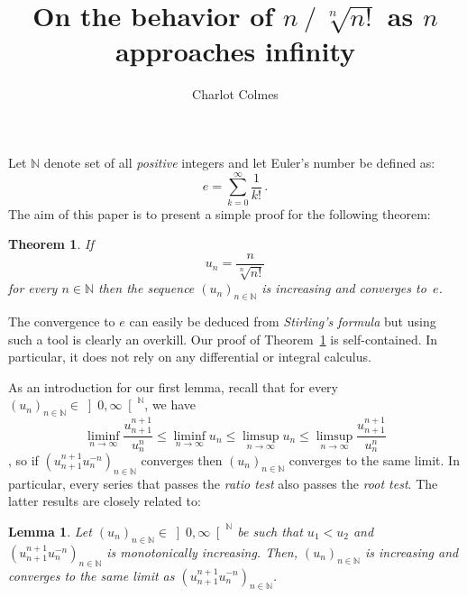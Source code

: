\documentclass[12pt]{article}
\newcommand{\bN}{\mathbb{N}} %
\newcommand{\Rpos}{\left]0, \infty\right[} %
\newtheorem{theorem}{Theorem}
\newtheorem{lemma}{Lemma}
\begin{document}
\sloppy

\title{On the behavior of $n \mathbin{/} \sqrt[n]{n!}$ as $n$ approaches infinity} 
\author{Charlot Colmes}
\maketitle

Let $\bN$ denote set of all \emph{positive} integers and
let Euler's number be defined as:
$$
e = \sum_{k = 0}^\infty \frac{1}{k!} \,. 
$$
The aim of this paper is to present a simple proof for the following theorem:

\begin{theorem} \label{thm:factnn-e}
If
$$
u_n = \frac{n}{\sqrt[n]{n!}}
$$
for every $n \in \bN$ then
the sequence $\left( u_n  \right)_{n \in \bN}$ is increasing and converges to~$e$.
\end{theorem}

The convergence to $e$ can easily be deduced from \emph{Stirling's formula}
\cite{GiaquintaModicaApprox, RudinPrinciples}
but using such a tool is clearly an overkill.
Our proof of Theorem~\ref{thm:factnn-e} is self-contained.
In particular, it does not rely on any differential or integral calculus.

As an introduction for our first lemma,
recall that for every $\left( u_n \right)_{n \in \bN} \in \Rpos^\bN$, we have 
$$
\liminf_{n \to \infty} \frac{u_{n + 1}^{n + 1}}{ u_n^{n}} 
\le
\liminf_{n \to \infty} u_n 
\le
\limsup_{n \to \infty} u_n
\le 
\limsup_{n \to \infty} \frac{u_{n + 1}^{n + 1}}{u_n^{n}} 
$$
\cite{RudinPrinciples},
so if $\left( u_{n + 1}^{n + 1} u_n^{- n} \right)_{n \in \bN}$ converges then
$\left( u_n \right)_{n \in \bN}$ converges to the same limit.
In particular, every series that passes the \emph{ratio test} also passes the \emph{root test}.
The latter results are closely related to:

\begin{lemma} \label{lem:root-vs-ratio}
  Let $\left( u_n \right)_{n \in \bN}  \in \Rpos^{\bN}$ be such that
  $u_1 < u_2$ and  
  $\left(  u_{n + 1}^{n + 1}  u_n^{-n} \right)_{n \in \bN}$ is monotonically increasing.
  Then,
  $\left(u_n \right)_{n \in \bN}$ is increasing and
  converges to the same limit as $\left(  u_{n + 1}^{n + 1}  u_n^{-n} \right)_{n \in \bN}$.
\end{lemma}
\end{document}
